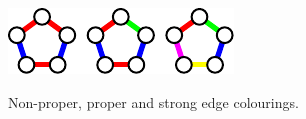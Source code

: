 \documentclass{uvamath}
\begin{document}
\begin{figure}[!ht]
    \centering
    \includegraphics[scale=1.25]{proper-strong-example}\par
    Non-proper, proper and strong edge colourings.
\end{figure}

\restoregeometry

\appendix




\printbibliography{}
\end{document}
